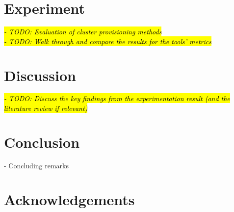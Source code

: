 \chapter{Experiment}

\hl{\textit{- TODO: Evaluation of cluster provisioning methods}}  \\
\hl{\textit{- TODO: Walk through and compare the results for the tools' metrics}}

\chapter{Discussion}


\hl{\textit{- TODO: Discuss the key findings from the experimentation result (and the literature review if relevant)}}  \\

\chapter{Conclusion}

- Concluding remarks


\chapter*{Acknowledgements}

\par{~}







